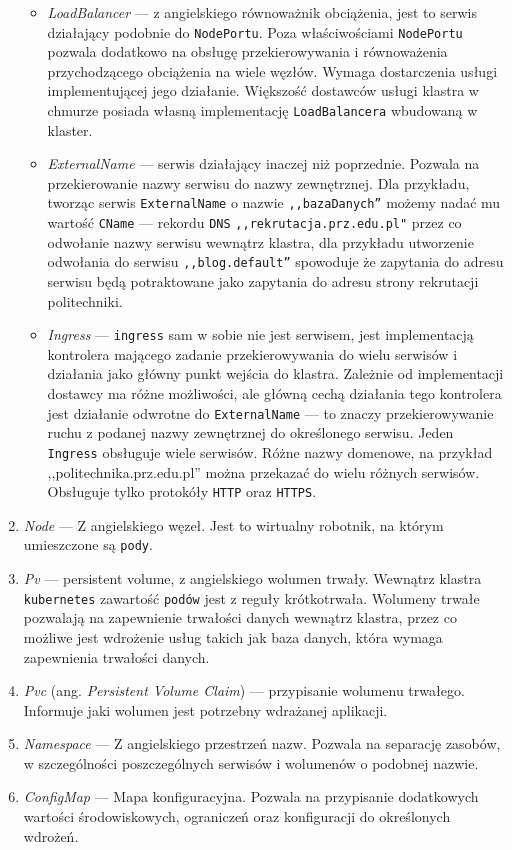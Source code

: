 \documentclass[12pt,twoside]{article}
\begin{document}
\begin{enumerate}[label=\arabic*), leftmargin=1.25cm]
\begin{itemize}[label=-,labelsep=0.4cm,leftmargin=0.6cm]
\item \textit{LoadBalancer} — z angielskiego równoważnik obciążenia, jest to serwis działający podobnie do \texttt{NodePortu}. Poza właściwościami \texttt{NodePortu} pozwala dodatkowo na obsługę przekierowywania i równoważenia przychodzącego obciążenia na wiele węzłów. Wymaga dostarczenia usługi implementującej jego działanie. Większość dostawców usługi klastra w chmurze posiada własną implementację \texttt{LoadBalancera} wbudowaną w klaster.
\item \textit{ExternalName} — serwis działający inaczej niż poprzednie. Pozwala na przekierowanie nazwy serwisu do nazwy zewnętrznej. Dla przykładu, tworząc serwis \texttt{ExternalName} o nazwie \texttt{,,bazaDanych''} możemy nadać mu wartość \texttt{CName} — rekordu \texttt{DNS} \texttt{,,rekrutacja.prz.edu.pl"} przez co odwołanie nazwy serwisu wewnątrz klastra, dla przykładu utworzenie odwołania do serwisu \texttt{,,blog.default''} spowoduje że zapytania do adresu serwisu będą potraktowane jako zapytania do adresu strony rekrutacji politechniki.
\item \textit{Ingress} — \texttt{ingress} sam w sobie nie jest serwisem, jest implementacją kontrolera mającego zadanie przekierowywania do wielu serwisów i działania jako główny punkt wejścia do klastra. Zależnie od implementacji dostawcy ma różne możliwości, ale główną cechą działania tego kontrolera jest działanie odwrotne do \texttt{ExternalName} — to znaczy przekierowywanie ruchu z podanej nazwy zewnętrznej do określonego serwisu. Jeden \texttt{Ingress} obsługuje wiele serwisów. Różne nazwy domenowe, na przykład ,,politechnika.prz.edu.pl'' można przekazać do wielu różnych serwisów. Obsługuje tylko protokóły \texttt{HTTP} oraz \texttt{HTTPS}.
\end{itemize}
\item \textit{Node} — Z angielskiego węzeł. Jest to wirtualny robotnik, na którym umieszczone są \texttt{pody}.
\item \textit{Pv} — persistent volume, z angielskiego wolumen trwały. Wewnątrz klastra \texttt{kubernetes} zawartość \texttt{podów} jest z reguły krótkotrwała. Wolumeny trwałe pozwalają na zapewnienie trwałości danych wewnątrz klastra, przez co możliwe jest wdrożenie usług takich jak baza danych, która wymaga zapewnienia trwałości danych.
\item \textit{Pvc} (ang. \textit{Persistent Volume Claim}) — przypisanie wolumenu trwałego. Informuje jaki wolumen jest potrzebny wdrażanej aplikacji.
\item \textit{Namespace} — Z angielskiego przestrzeń nazw. Pozwala na separację zasobów, w szczególności poszczególnych serwisów i wolumenów o podobnej nazwie.
\item \textit{ConfigMap} — Mapa konfiguracyjna. Pozwala na przypisanie dodatkowych wartości środowiskowych, ograniczeń oraz konfiguracji do określonych wdrożeń.
\end{enumerate}
\clearpage
\end{document}
